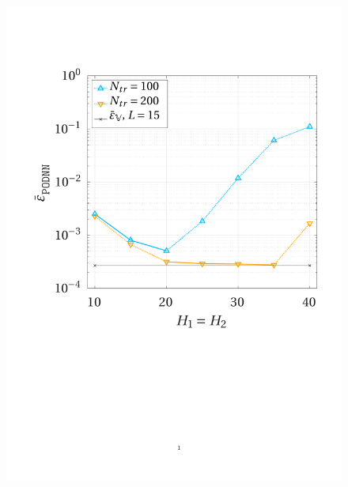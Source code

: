 \documentclass[12pt, a4paper, twoside, openright, notitlepage]{report}
\numberwithin{equation}{chapter}
\theoremstyle{theorem}
\theoremstyle{definition}
\theoremstyle{remark}
\theoremstyle{proposition}
\numberwithin{figure}{chapter}
\begin{document}
		\begin{figure}[H]
			\center
			\includegraphics[scale = 0.39, trim = {1.5cm 9cm 1.5cm 3.5cm}, clip]{poisson2d_1_nn_convergence}
			\hspace*{0.5cm}

\end{figure}
\end{document}
